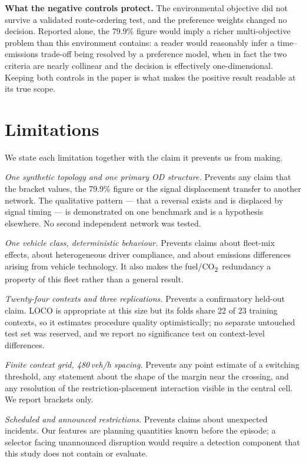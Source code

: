 \documentclass[10pt,a4paper]{article}
\newcommand{\CO}{CO\textsubscript{2}}
\begin{document}
\textbf{What the negative controls protect.} The environmental objective did not survive a validated route-ordering test, and the preference weights changed no decision. Reported alone, the 79.9\% figure would imply a richer multi-objective problem than this environment contains: a reader would reasonably infer a time--emissions trade-off being resolved by a preference model, when in fact the two criteria are nearly collinear and the decision is effectively one-dimensional. Keeping both controls in the paper is what makes the positive result readable at its true scope.

\section{Limitations}
We state each limitation together with the claim it prevents us from making.

\emph{One synthetic topology and one primary OD structure.} Prevents any claim that the bracket values, the 79.9\% figure or the signal displacement transfer to another network. The qualitative pattern --- that a reversal exists and is displaced by signal timing --- is demonstrated on one benchmark and is a hypothesis elsewhere. No second independent network was tested.

\emph{One vehicle class, deterministic behaviour.} Prevents claims about fleet-mix effects, about heterogeneous driver compliance, and about emissions differences arising from vehicle technology. It also makes the fuel/\CO\ redundancy a property of this fleet rather than a general result.

\emph{Twenty-four contexts and three replications.} Prevents a confirmatory held-out claim. LOCO is appropriate at this size but its folds share 22 of 23 training contexts, so it estimates procedure quality optimistically; no separate untouched test set was reserved, and we report no significance test on context-level differences.

\emph{Finite context grid, 480\,veh/h spacing.} Prevents any point estimate of a switching threshold, any statement about the shape of the margin near the crossing, and any resolution of the restriction-placement interaction visible in the central cell. We report brackets only.

\emph{Scheduled and announced restrictions.} Prevents claims about unexpected incidents. Our features are planning quantities known before the episode; a selector facing unannounced disruption would require a detection component that this study does not contain or evaluate.
\end{document}
